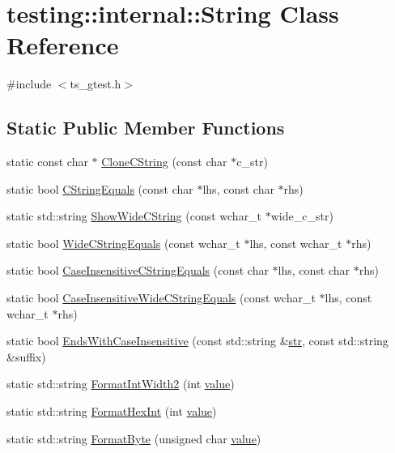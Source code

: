 \hypertarget{classtesting_1_1internal_1_1String}{\section{testing\-:\-:internal\-:\-:String Class Reference}
\label{classtesting_1_1internal_1_1String}
}


{\ttfamily \#include $<$ts\-\_\-gtest.\-h$>$}

\subsection*{Static Public Member Functions}
\begin{DoxyCompactItemize}
\item 
static const char $\ast$ \hyperlink{classtesting_1_1internal_1_1String_a8bce6b1281ae3d2f9061b920aa78aca0}{Clone\-C\-String} (const char $\ast$c\-\_\-str)
\item 
static bool \hyperlink{classtesting_1_1internal_1_1String_a06919f642bd47f0593196b460d352f24}{C\-String\-Equals} (const char $\ast$lhs, const char $\ast$rhs)
\item 
static std\-::string \hyperlink{classtesting_1_1internal_1_1String_acbf0511e9ae5009f42de77e565f6ba61}{Show\-Wide\-C\-String} (const wchar\-\_\-t $\ast$wide\-\_\-c\-\_\-str)
\item 
static bool \hyperlink{classtesting_1_1internal_1_1String_a4f5e053907ebced07fe0dc52dd2d1e85}{Wide\-C\-String\-Equals} (const wchar\-\_\-t $\ast$lhs, const wchar\-\_\-t $\ast$rhs)
\item 
static bool \hyperlink{classtesting_1_1internal_1_1String_a7ce24c41c67b928fe89434d3571c988c}{Case\-Insensitive\-C\-String\-Equals} (const char $\ast$lhs, const char $\ast$rhs)
\item 
static bool \hyperlink{classtesting_1_1internal_1_1String_a0a67eac434fa7800640c9d56cb91e105}{Case\-Insensitive\-Wide\-C\-String\-Equals} (const wchar\-\_\-t $\ast$lhs, const wchar\-\_\-t $\ast$rhs)
\item 
static bool \hyperlink{classtesting_1_1internal_1_1String_a3de1df085eddc89ef3f3833c67aee3fe}{Ends\-With\-Case\-Insensitive} (const std\-::string \&\hyperlink{core__c_8h_a5f3a65d240411b0018990ff992b348c0}{str}, const std\-::string \&suffix)
\item 
static std\-::string \hyperlink{classtesting_1_1internal_1_1String_a51cab855f7ec6091e5886b6be5598ca2}{Format\-Int\-Width2} (int \hyperlink{highgui__c_8h_ad4670c92695d4327c21292905a803901}{value})
\item 
static std\-::string \hyperlink{classtesting_1_1internal_1_1String_a7bedf4780e0c938d203b73ddb17ff490}{Format\-Hex\-Int} (int \hyperlink{highgui__c_8h_ad4670c92695d4327c21292905a803901}{value})
\item 
static std\-::string \hyperlink{classtesting_1_1internal_1_1String_ab3555eeb6abe4b7c6f63d865af10379d}{Format\-Byte} (unsigned char \hyperlink{highgui__c_8h_ad4670c92695d4327c21292905a803901}{value})
\end{DoxyCompactItemize}


